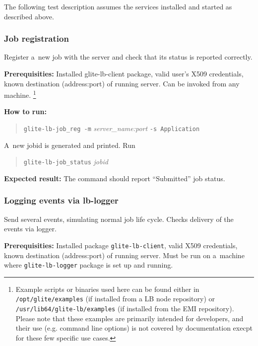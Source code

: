 The following test description assumes the \LB services installed
and started as described above.

\def\req{\noindent\textbf{Prerequisities:}\xspace}
\def\how{\noindent\textbf{How to run:}\xspace}
\def\result{\noindent\textbf{Expected result:}\xspace}

\subsubsection{Job registration}

Register a~new job with the \LB server and check that its status is
reported correctly.

\req Installed glite-lb-client package, valid user's X509 credentials,
known destination (address:port) of running \LB server.
Can be invoked from any machine.
\footnote{Example scripts or binaries used here can be found either
in \texttt{/opt/glite/examples} (if installed from a LB node repository) or
\texttt{/usr/lib64/glite-lb/examples} (if installed from the EMI repository). Please note that these examples are primarily intended for developers, and their use (e.g. command line options) is not covered by documentation execpt for these few specific use cases.}\setcounter{examplesfootnote}{\thefootnote}

\how 
\begin{quote}
\texttt{glite-lb-job\_reg -m} \emph{server\_name:port} \texttt{-s Application}
\end{quote}
A~new jobid is generated and printed.  Run 
\begin{quote}
\verb'glite-lb-job_status' \emph{jobid}
\end{quote}

\result
The command should report ``Submitted'' job status.

\subsubsection{Logging events via lb-logger}

\label{smoke-log}

Send several \LB events, simulating normal job life cycle.
Checks delivery of the events via \LB logger.

\req Installed package \texttt{glite-lb-client}, valid X509 credentials,
known destination (address:port) of running \LB server.
Must be run on a~machine where \texttt{glite-lb-logger} package is set up and running.\footnotemark[\theexamplesfootnote]

